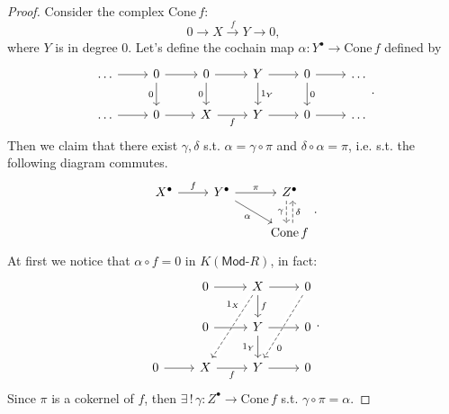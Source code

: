 \begin{proof}
	Consider the complex $\mathrm{Cone}\, f$:
	\begin{equation}
		0 \to X \xrightarrow{f} Y \to 0
	,\end{equation} 
	where $Y$ is in degree $0$.
	Let's define the cochain map $\alpha\colon Y^\bullet \to \mathrm{Cone}\, f$
	defined by
	\begin{equation}
	\begin{tikzcd}
		\ldots \arrow[r, "", rightarrow] &
		0 \arrow[r, "", rightarrow] \arrow[d, "0"', rightarrow] &
		0 \arrow[r, "", rightarrow] \arrow[d, "0"', rightarrow] &
		Y \arrow[r, "", rightarrow] \arrow[d, "1_Y", rightarrow] &
		0 \arrow[r, "", rightarrow] \arrow[d, "0", rightarrow] &
		\ldots \\
		\ldots \arrow[r, "", rightarrow] &
		0 \arrow[r, "", rightarrow] &
		X \arrow[r, "f"', rightarrow] &
		Y \arrow[r, "", rightarrow] &
		0 \arrow[r, "", rightarrow] & \ldots
	\end{tikzcd}
	.\end{equation} 
	Then we claim that there exist $\gamma, \delta$ s.t. $\alpha = \gamma \circ \pi$ and $\delta \circ \alpha = \pi$,
	i.e. s.t. the following diagram commutes.
	\begin{equation}
		\begin{tikzcd}
		X^\bullet \arrow[r, "f", rightarrow] &
		Y^\bullet \arrow[r, "\pi", rightarrow] \arrow[dr, "\alpha"', rightarrow] &
		Z^\bullet \arrow[d, "\gamma"', dashrightarrow, shift right = 0.25em] \\
		& &
		\mathrm{Cone}\, f \arrow[u, "\delta"', dashrightarrow, shift right = 0.25em]
	\end{tikzcd}
	.\end{equation} 
	At first we notice that $\alpha \circ f = 0 $ in $K(\mathsf{Mod}\text{-}R)$, in fact:
	\begin{equation}
	\begin{tikzcd}
		&
		0 \arrow[r, "", rightarrow] &
		X \arrow[r, "", rightarrow] \arrow[d, "f", rightarrow] \arrow[ddl, "1_X"' near start, dashrightarrow, crossing over] &
		0 \arrow[ldd, "0" near end, dashrightarrow, crossing over]\\
		&
		0 \arrow[r, "", rightarrow] &
		Y \arrow[r, "", rightarrow] \arrow[d, "1_Y"', rightarrow] &
		0 \\
		0 \arrow[r, "", rightarrow] &
		X \arrow[r, "f"', rightarrow] &
		Y \arrow[r, "", rightarrow] &
		0
	\end{tikzcd}
	.\end{equation} 
	Since $\pi$ is a cokernel of $f$, then $\exists\, !\, \gamma\colon Z^\bullet \to \mathrm{Cone}\, f$ s.t. $\gamma \circ \pi = \alpha$.

\end{proof}

